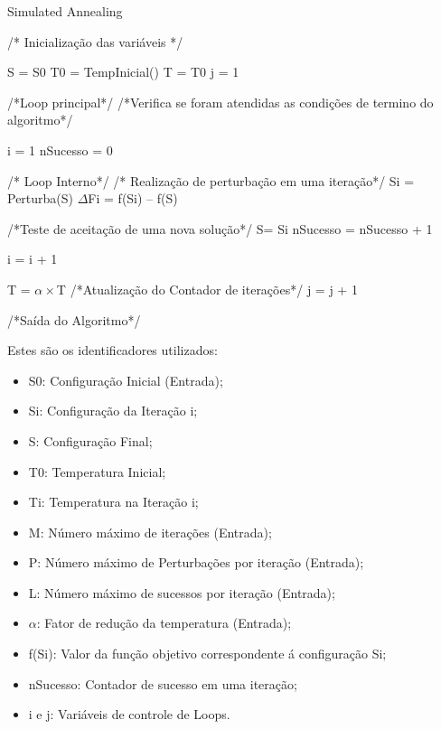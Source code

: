\documentclass[
	12pt,				%
	openright,			%
	twoside,			%
	a4paper,			%
	english,			%
	french,				%
	spanish,			%
	brazil				%
	]{abntex2}
\begin{document}
\begin{algorithm}
	\caption{Simulated Annealing}\label{sa}
	\begin{algorithmic}[1]
		
		\State/* Inicialização das variáveis */
		
		\State S = S0
		\State T0 = TempInicial()
		\State T = T0
		\State j = 1
		
		\State /*Loop principal*/
		\State /*Verifica se foram atendidas as condições de termino do algoritmo*/
		\Repeat
		
		\State i = 1
		\State nSucesso = 0
		
		\State /* Loop Interno*/
		\State /* Realização de perturbação em uma iteração*/
			\Repeat
				\State Si = Perturba(S)
			    \State $\Delta$Fi = f(Si) – f(S)
			    
			    \State /*Teste de aceitação de uma nova solução*/
			        \State S= Si
			        \State nSucesso = nSucesso + 1
			    \EndIf
			
			\State i = i + 1
		
		   \State T = $\alpha \times$T
		   \State /*Atualização do Contador de iterações*/
		   \State j = j + 1
		
		
		\State /*Saída do Algoritmo*/
		\State {}
		
		\EndProcedure
	\end{algorithmic}
\end{algorithm}

%

Estes são os identificadores utilizados:

\begin{itemize}
	\item S0: Configuração Inicial (Entrada);
	\item Si: Configuração da Iteração i;
	\item S: Configuração Final;
	\item T0: Temperatura Inicial;
	\item Ti: Temperatura na Iteração i;
	\item M: Número máximo de iterações (Entrada);
	\item P: Número máximo de Perturbações por iteração (Entrada);
	\item L: Número máximo de sucessos por iteração (Entrada);
	\item $ \alpha $: Fator de redução da temperatura (Entrada);
	\item f(Si): Valor da função objetivo correspondente á configuração Si;
	\item nSucesso: Contador de sucesso em uma iteração;
	\item i e j: Variáveis de controle de Loops.
\end{itemize}
\end{document}
